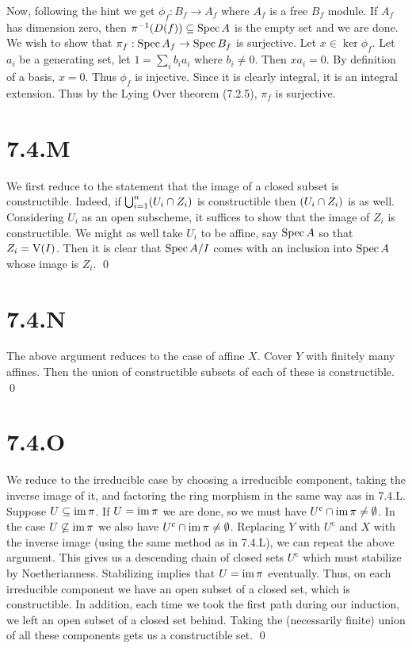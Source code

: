 \documentclass{article}
\begin{document}
Now, following the hint we get $\phi_f: B_f \to A_f$ where
$A_f$ is a free $B_f$ module. If
$A_f$ has dimension zero, then $\pi^{-1}(D(f)) \subseteq \operatorname{Spec} A$ is the
empty set and we are done. We wish to show that $\pi_f: \operatorname{Spec} A_f \to \operatorname{Spec} B_f$ is
surjective. Let $x \in \ker \phi_f$. Let $a_i$ be a
generating set, let $1=\sum_i b_ia_i$ where $b_i \neq 0$. Then
$xa_i=0$. By definition of a basis, $x=0$.
Thus $\phi_f$ is injective. Since it is clearly integral, it is
an integral extension. Thus by the Lying Over theorem (7.2.5),
$\pi_f$ is surjective.

\section{7.4.M}
We first reduce to the statement that the image of a closed subset is
constructible. Indeed, if $\bigcup_{i=1}^n (U_i \cap Z_i)$ is constructible then
$(U_i \cap Z_i)$ is as well. Considering $U_i$ as an
open subscheme, it suffices to show that the image of $Z_i$
is constructible. We might as well take $U_i$ to be affine,
say $\operatorname{Spec} A$ so that $Z_i=\operatorname{V}(I)$. Then it is clear
that $\operatorname{Spec} A/I$ comes with an inclusion into
$\operatorname{Spec} A$ whose image is $Z_i$. \qed

\section{7.4.N}
The above argument reduces to the case of affine $X$. Cover
$Y$ with finitely many affines. Then the union of
constructible subsets of each of these is constructible. \qed

\section{7.4.O}
We reduce to the irreducible case by choosing a irreducible component, taking
the inverse image of it, and factoring the ring morphism in the same way aas in
7.4.L. Suppose $U \subseteq \operatorname{im} \pi$. If $U=\operatorname{im} \pi$ we are done,
so we must have $U^{\text{c}} \cap \operatorname{im} \pi \neq \emptyset$. In the case $U \not \subseteq \operatorname{im} \pi$ we
also have $U^{\text{c}} \cap \operatorname{im} \pi \neq \emptyset$. Replacing $Y$ with
$U^{\text{c}}$ and $X$ with the inverse image
(using the same method as in 7.4.L), we can repeat the above argument. This
gives us a descending chain of closed sets $U^{\text{c}}$ which must
stabilize by Noetherianness. Stabilizing implies that $U=\operatorname{im} \pi$
eventually. Thus, on each irreducible component we have an open subset of a
closed set, which is constructible. In addition, each time we took the first
path during our induction, we left an open subset of a closed set behind.
Taking the (necessarily finite) union of all these components gets us a
constructible set. \qed
\end{document}
